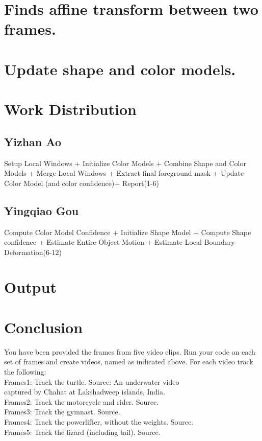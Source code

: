 \documentclass[15pt]{article}
\begin{document}
\section{Finds affine transform between two frames.}
\section{Update shape and color models.}

\section{Work Distribution}
\subsection{Yizhan Ao}
Setup Local Windows + Initialize Color Models + Combine Shape and Color Models + Merge Local Windows + Extract final foreground mask + Update Color Model (and color confidence)+ Report(1-6)
\subsection{Yingqiao Gou}
Compute Color Model Confidence + Initialize Shape Model + Compute Shape confidence + Estimate Entire-Object Motion + Estimate Local Boundary Deformation(6-12)

\section{Output}


\section{Conclusion}
You have been provided the frames from five video clips. Run your code on each set of frames and create videos, named as indicated above. For each video track the following:\\

Frames1: Track the turtle. Source: An underwater video\\ captured by Chahat at Lakshadweep islands, India.\\
Frames2: Track the motorcycle and rider. Source.\\
Frames3: Track the gymnast. Source.\\
Frames4: Track the powerlifter, without the weights. Source.\\
Frames5: Track the lizard (including tail). Source. \\
\end{document}
